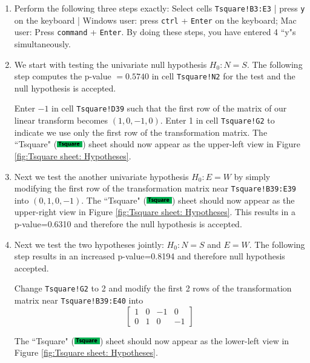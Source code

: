 \documentclass[article]{jss}
\numberwithin{equation}{subsection}
\newcommand{\shtTsquare}{``Tsquare" (\includegraphics[height=8pt, keepaspectratio=true]{TsquareSheetTab_png}) }
\begin{document}
        \begin{enumerate}
                \item Perform the following three steps exactly: Select cells \texttt{Tsquare!B3:E3} | press \texttt{y} on the keyboard | Windows user: press \texttt{ctrl} + \texttt{Enter} on the keyboard; Mac user: Press \texttt{command} + \texttt{Enter}. By doing these steps, you have entered 4 ``y"s simultaneously.
                
                \item We start with testing the univariate null hypothesis $H_0: N = S$. The following step computes the p-value $=0.5740$ in cell \texttt{Tsquare!N2} for the test and the null hypothesis is accepted.
                
                Enter $-1$ in cell \texttt{Tsquare!D39} such that the first row of the matrix of our linear transform becomes $(1,0,-1,0)$. Enter 1 in cell \texttt{Tsquare!G2} to indicate we use only the first row of the transformation matrix. The \shtTsquare sheet should now appear as the upper-left view in Figure \ref{fig:Tsquare sheet: Hypotheses}.
                
               \item Next we test the another univariate hypothesis $H_0: E = W$ by simply modifying the first row of the transformation matrix near \texttt{Tsquare!B39:E39} into $(0,1,0,-1)$. The \shtTsquare sheet should now appear as the upper-right view in Figure \ref{fig:Tsquare sheet: Hypotheses}. This results in a p-value=0.6310 and therefore the null hypothesis is accepted.
                
                
                \item Next we test the two hypotheses jointly: $H_0: N=S$ and $E=W$. The following step results in an increased p-value=0.8194 and therefore null hypothesis accepted.
                
                Change \texttt{Tsquare!G2} to 2 and modify the first 2 rows of the transformation matrix near \texttt{Tsquare!B39:E40} into 
                \[\left[ {\begin{array}{*{20}{c}}
                        1&0&-1&0 \\ 
                        0&1&0&-1
                        \end{array}} \right]\]
                
                
                The \shtTsquare sheet should now appear as the lower-left view in Figure \ref{fig:Tsquare sheet: Hypotheses}.
                

\end{enumerate}
\end{document}
